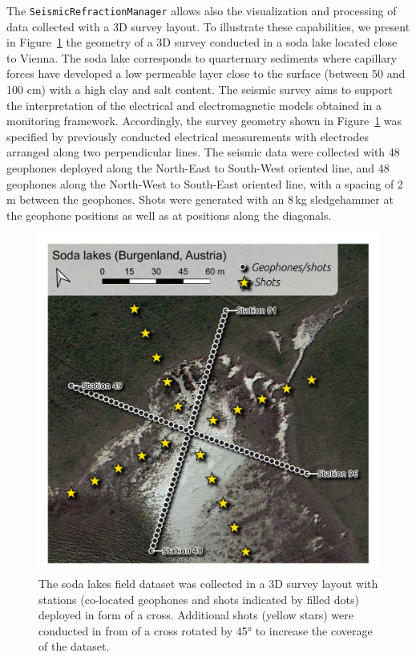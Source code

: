 \documentclass[a4paper,fleqn]{cas-sc}
\begin{document}
The \texttt{SeismicRefractionManager} allows also the visualization and processing of data collected with a 3D survey layout. To illustrate these capabilities, we present in Figure~\ref{fig:map_sodalakes} the geometry of a 3D survey conducted in a soda lake located close to Vienna. The soda lake corresponds to quarternary sediments where capillary forces have developed a low permeable layer close to the surface (between 50 and 100 cm) with a high clay and salt content.
The seismic survey aims to support the interpretation of the electrical and electromagnetic models obtained in a monitoring framework. 
Accordingly, the survey geometry shown in Figure~\ref{fig:map_sodalakes} was specified by previously conducted electrical measurements with electrodes arranged along two perpendicular lines. The seismic data were collected with 48 geophones deployed along the North-East to South-West oriented line, and 48 geophones along the North-West to South-East oriented line, with a spacing of 2\,m between the geophones. Shots were generated with an 8\,kg sledgehammer at the geophone positions as well as at positions along the diagonals. %

\begin{figure}
	\centering
	\includegraphics[width=.75\textwidth]{./figures/map_sodalakes.pdf}
	\caption{The soda lakes field dataset was collected in a 3D survey layout with stations (co-located geophones and shots indicated by filled dots) deployed in form of a cross. Additional shots (yellow stars) were conducted in from of a cross rotated by 45° to increase the coverage of the dataset.}
	\label{fig:map_sodalakes}
\end{figure}
\end{document}
